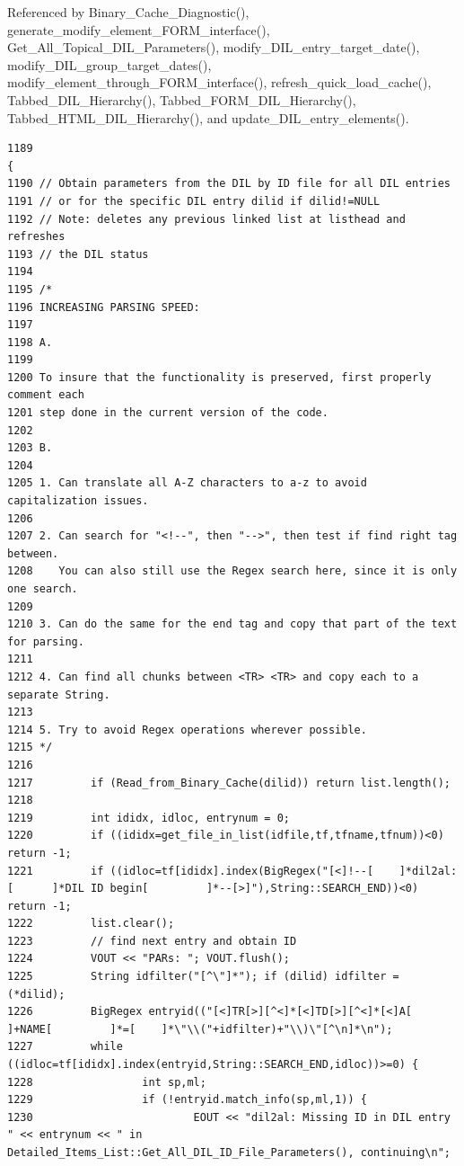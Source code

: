 Referenced by Binary\_\-Cache\_\-Diagnostic(), generate\_\-modify\_\-element\_\-FORM\_\-interface(), Get\_\-All\_\-Topical\_\-DIL\_\-Parameters(), modify\_\-DIL\_\-entry\_\-target\_\-date(), modify\_\-DIL\_\-group\_\-target\_\-dates(), modify\_\-element\_\-through\_\-FORM\_\-interface(), refresh\_\-quick\_\-load\_\-cache(), Tabbed\_\-DIL\_\-Hierarchy(), Tabbed\_\-FORM\_\-DIL\_\-Hierarchy(), Tabbed\_\-HTML\_\-DIL\_\-Hierarchy(), and update\_\-DIL\_\-entry\_\-elements().



\footnotesize\begin{verbatim}1189                                                                              {
1190 // Obtain parameters from the DIL by ID file for all DIL entries
1191 // or for the specific DIL entry dilid if dilid!=NULL
1192 // Note: deletes any previous linked list at listhead and refreshes
1193 // the DIL status
1194 
1195 /*
1196 INCREASING PARSING SPEED:
1197 
1198 A.
1199 
1200 To insure that the functionality is preserved, first properly comment each
1201 step done in the current version of the code.
1202 
1203 B.
1204 
1205 1. Can translate all A-Z characters to a-z to avoid capitalization issues.
1206 
1207 2. Can search for "<!--", then "-->", then test if find right tag between.
1208    You can also still use the Regex search here, since it is only one search.
1209 
1210 3. Can do the same for the end tag and copy that part of the text for parsing.
1211 
1212 4. Can find all chunks between <TR> <TR> and copy each to a separate String.
1213 
1214 5. Try to avoid Regex operations wherever possible.
1215 */
1216 
1217         if (Read_from_Binary_Cache(dilid)) return list.length();
1218 
1219         int ididx, idloc, entrynum = 0;
1220         if ((ididx=get_file_in_list(idfile,tf,tfname,tfnum))<0) return -1;
1221         if ((idloc=tf[ididx].index(BigRegex("[<]!--[    ]*dil2al:[      ]*DIL ID begin[         ]*--[>]"),String::SEARCH_END))<0) return -1;
1222         list.clear();
1223         // find next entry and obtain ID
1224         VOUT << "PARs: "; VOUT.flush();
1225         String idfilter("[^\"]*"); if (dilid) idfilter = (*dilid);
1226         BigRegex entryid(("[<]TR[>][^<]*[<]TD[>][^<]*[<]A[      ]+NAME[         ]*=[    ]*\"\\("+idfilter)+"\\)\"[^\n]*\n");
1227         while ((idloc=tf[ididx].index(entryid,String::SEARCH_END,idloc))>=0) {
1228                 int sp,ml;
1229                 if (!entryid.match_info(sp,ml,1)) {
1230                         EOUT << "dil2al: Missing ID in DIL entry " << entrynum << " in Detailed_Items_List::Get_All_DIL_ID_File_Parameters(), continuing\n";

\end{verbatim}
